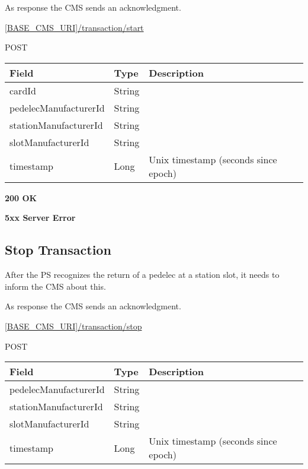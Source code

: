 As response the \acs{CMS} sends an acknowledgment.

 \url{[BASE_CMS_URI]/transaction/start}

 POST

\begin{table}[!h]
\vspace{-7mm}
\begin{tabularx}{\linewidth}{ | l | l | X | }
  \hline
  \rowcolor{table-head}
  Field & Type & Description \\
  \hline
  	cardId & String 		& \\
  	pedelecManufacturerId & String			& \\
  	stationManufacturerId & String			& \\
  	slotManufacturerId & String			& \\
  	timestamp & Long					& Unix timestamp (seconds since epoch) \\
    \hline
\end{tabularx}
\end{table}

 \textbf{200 OK}

 \textbf{5xx Server Error}

\subsection{Stop Transaction}

After the \acs{PS} recognizes the return of a pedelec at a station slot, it needs to inform the \acs{CMS} about this.

As response the \acs{CMS} sends an acknowledgment.

 \url{[BASE_CMS_URI]/transaction/stop}

 POST

\begin{table}[!h]
\vspace{-7mm}
\begin{tabularx}{\linewidth}{ | l | l | X | }
  \hline
  \rowcolor{table-head}
  Field & Type & Description \\
  \hline
  	pedelecManufacturerId			& String & \\
  	stationManufacturerId			& String & \\
  	slotManufacturerId			& String & \\
  	timestamp					& Long & Unix timestamp (seconds since epoch) \\
  	
    \hline
\end{tabularx}
\end{table}

